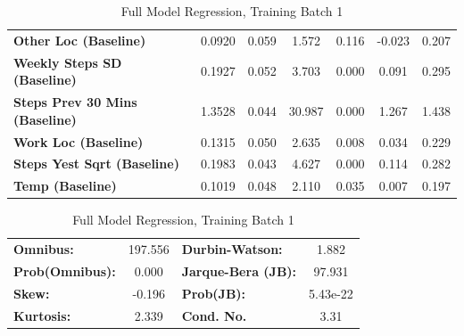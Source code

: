 \begin{table}
\begin{tabular}{lcccccc}
\textbf{Other Loc (Baseline)}          &       0.0920  &        0.059     &     1.572  &         0.116        &       -0.023    &        0.207     \\
\textbf{Weekly Steps SD (Baseline)}    &       0.1927  &        0.052     &     3.703  &         0.000        &        0.091    &        0.295     \\
\textbf{Steps Prev 30 Mins (Baseline)} &       1.3528  &        0.044     &    30.987  &         0.000        &        1.267    &        1.438     \\
\textbf{Work Loc (Baseline)}           &       0.1315  &        0.050     &     2.635  &         0.008        &        0.034    &        0.229     \\
\textbf{Steps Yest Sqrt (Baseline)}    &       0.1983  &        0.043     &     4.627  &         0.000        &        0.114    &        0.282     \\
\textbf{Temp (Baseline)}               &       0.1019  &        0.048     &     2.110  &         0.035        &        0.007    &        0.197     \\
\bottomrule
\end{tabular}
\begin{tabular}{lclc}
\textbf{Omnibus:}       & 197.556 & \textbf{  Durbin-Watson:     } &    1.882  \\
\textbf{Prob(Omnibus):} &   0.000 & \textbf{  Jarque-Bera (JB):  } &   97.931  \\
\textbf{Skew:}          &  -0.196 & \textbf{  Prob(JB):          } & 5.43e-22  \\
\textbf{Kurtosis:}      &   2.339 & \textbf{  Cond. No.          } &     3.31  \\
\bottomrule
\end{tabular}
\caption{Full Model Regression, Training Batch 1}
\end{table}

\medskip

